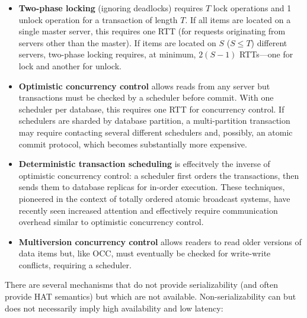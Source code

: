 \begin{itemize}
\item \textbf{Two-phase locking} (ignoring deadlocks) requires $T$
  lock operations and 1 unlock operation for a transaction of length
  $T$. If all items are located on a single master server, this
  requires one RTT (for requests originating from servers other than
  the master). If items are located on $S$ ($S \leq T$) different
  servers, two-phase locking requires, at minimum, $2(S-1)$ RTTs---one
  for lock and another for unlock.

\item \textbf{Optimistic concurrency control} allows reads from any
  server but transactions must be checked by a scheduler before
  commit. With one scheduler per database, this requires one RTT for
  concurrency control. If schedulers are sharded by database
  partition, a multi-partition transaction may require contacting
  several different schedulers and, possibly, an atomic commit
  protocol, which becomes substantially more expensive.

\item \textbf{Deterministic transaction scheduling} is effecitvely the
  inverse of optimistic concurrency control: a scheduler first orders
  the transactions, then sends them to database replicas for in-order
  execution. These techniques, pioneered in the context of totally
  ordered atomic broadcast systems, have recently seen increased
  attention and effectively require communication overhead similar to
  optimistic concurrency control.

\item\textbf{Multiversion concurrency control} allows readers to read
  older versions of data items but, like OCC, must eventually be
  checked for write-write conflicts, requiring a scheduler.

\end{itemize}

There are several mechanisms that do not provide serializability (and
often provide HAT semantics) but which are not
available. Non-serializability can but does not necessarily imply high
availability and low latency:

